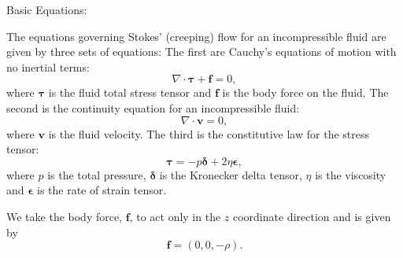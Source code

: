   {\large \fontB Basic Equations:}

  The equations governing Stokes' (creeping) flow for an incompressible fluid are given by three sets of equations:
  The first are Cauchy's equations of motion with no inertial terms:
  \begin{equation}
    \nabla\cdot\bm{\tau} + \bm{f} = 0,
  \end{equation}
  where $\bm{\tau}$ is the fluid total stress tensor and $\bm{f}$ is the body force on the fluid.
  The second is the continuity equation for an incompressible fluid:
  \begin{equation}
    \nabla\cdot\bm{v} = 0,
  \end{equation}
  where $\bm{v}$ is the fluid velocity. The third is the constitutive law for the stress tensor:
  \begin{equation}
    \bm{\tau} = -p\bm{\delta} + 2\eta\bm{\epsilon},
  \end{equation}
  where $p$ is the total pressure, $\bm{\delta}$ is the Kronecker delta tensor, $\eta$ is the viscosity and
  $\bm{\epsilon}$ is the rate of strain tensor.
  
  We take the body force, $\bm{f}$, to act only in the $z$ coordinate direction and is given by
  \begin{equation}
    \bm{f} = (0,0,-\rho).
  \end{equation}

